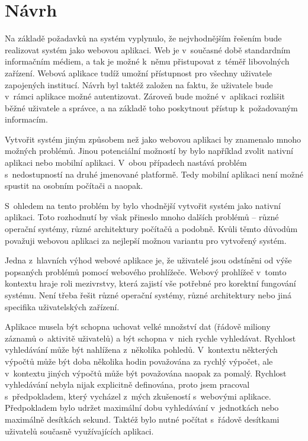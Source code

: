 \documentclass[thesis=M,czech]{FITthesis}[2012/06/26]
\begin{document}
\section{Návrh}

  Na základě požadavků na systém vyplynulo, že nejvhodnějším řešením bude realizovat systém jako webovou aplikaci. 
  Web je v~současné době standardním informačním médiem, a tak je možné k~němu přistupovat z~téměř libovolných zařízení.
  Webová aplikace tudíž umožní přístupnost pro všechny uživatele zapojených institucí. 
  Návrh byl taktéž založen na faktu, že uživatele bude v~rámci aplikace možné autentizovat.
  Zároveň bude možné v~aplikaci rozlišit běžné uživatele a správce, a na základě toho poskytnout přístup k~požadovaným informacím.

  Vytvořit systém jiným způsobem než jako webovou aplikaci by znamenalo mnoho možných problémů.
  Jinou potenciální možností by bylo například zvolit nativní aplikaci nebo mobilní aplikaci.
  V~obou případech nastává problém s~nedostupností na druhé jmenované platformě. 
  Tedy mobilní aplikaci není možné spustit na osobním počítači a naopak.

  S~ohledem na tento problém by bylo vhodnější vytvořit systém jako nativní aplikaci.
  Toto rozhodnutí by však přineslo mnoho dalších problémů -- různé operační systémy,
  různé architektury počítačů a podobně.
  Kvůli těmto důvodům považuji webovou aplikaci za nejlepší možnou variantu pro vytvořený systém.

  Jedna z~hlavních výhod webové aplikace je, že uživatelé jsou odstíněni od výše popsaných problémů
  pomocí webového prohlížeče.
  Webový prohlížeč v~tomto kontextu hraje roli mezivrstvy, 
  která zajistí vše potřebné pro korektní fungování systému.
  Není třeba řešit různé operační systémy, různé architektury 
  nebo jiná specifika uživatelských zařízení.

  Aplikace musela být schopna uchovat velké množství dat (řádově miliony záznamů o~aktivitě uživatelů) 
  a být schopna v~nich rychle vyhledávat.
  Rychlost vyhledávání může být nahlížena z~několika pohledů.
  V~kontextu některých výpočtů může být doba několika hodin považována za rychlý výpočet,
  ale v~kontextu jiných výpočtů může být považována naopak za pomalý.
  Rychlost vyhledávání nebyla nijak explicitně definována, proto jsem pracoval s~předpokladem,
  který vycházel z~mých zkušeností s~webovými aplikace.
  Předpokladem bylo udržet maximální dobu vyhledávání v~jednotkách nebo maximálně desítkách sekund.
  Taktéž bylo nutné počítat s~řádově desítkami uživatelů současně využívajících aplikaci.
  
\end{document}
